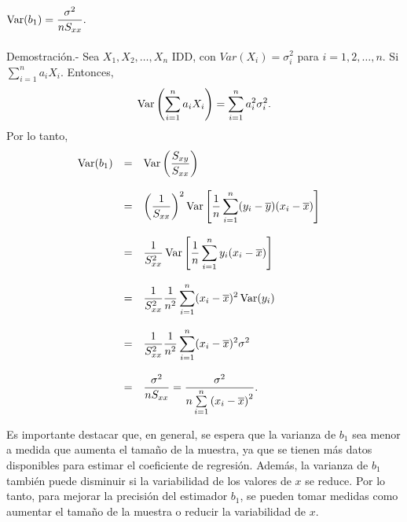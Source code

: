 \begin{teo}
    $\mathop{\mbox{\normalfont Var}}\nolimits(b_1) = \dfrac{\sigma^2}{nS_{xx}}.$\\\\

	Demostración.-\; Sea $X_1,X_2,\ldots,X_n$ IDD, con $Var(X_i)=\sigma_i^2$ para $i=1,2,\ldots,n$. Si $\displaystyle\sum_{i=1}^n a_iX_i.$ Entonces, 
	$$\mathop{\mbox{\normalfont Var}}\nolimits\left(\displaystyle\sum_{i=1}^n a_iX_i\right)=\displaystyle\sum_{i=1}^n a_i^2\sigma_i^2.$$ 
	Por lo tanto,
	$$
	\begin{array}{rcll}
	    \mathop{\mbox{\normalfont Var}}\nolimits(b_1) &=& \mathop{\mbox{\normalfont Var}}\nolimits\left(\dfrac{S_{xy}}{S_{xx}}\right)&\\\\
		      &=& \left(\dfrac{1}{S_{xx}}\right)^2\mathop{\mbox{\normalfont Var}}\nolimits\left[\dfrac{1}{n}\displaystyle\sum_{i=1}^n(y_i-\overline{y})(x_i-\overline{x})\right]&\\\\
		      &=& \dfrac{1}{S_{xx}^2}\mathop{\mbox{\normalfont Var}}\nolimits\left[\dfrac{1}{n}\displaystyle\sum_{i=1}^n y_i(x_i-\overline{x})\right]&\\\\
		      &=& \dfrac{1}{S_{xx}^2}\dfrac{1}{n^2}\displaystyle\sum_{i=1}^n (x_i-\overline{x})^2\mathop{\mbox{\normalfont Var}}\nolimits(y_i)&\\\\
		      &=& \dfrac{1}{S_{xx}^2}\dfrac{1}{n^2}\displaystyle\sum_{i=1}^n (x_i-\overline{x})^2\sigma^2\\\\
		      &=& \dfrac{\sigma^2}{nS_{xx}} = \dfrac{\sigma^2}{n\sum\limits_{i=1}^n \left(x_i-\overline{x}\right)^2}.
	\end{array}
	$$
\end{teo}

Es importante destacar que, en general, se espera que la varianza de $b_1$ sea menor a medida que aumenta el tamaño de la muestra, ya que se tienen más datos disponibles para estimar el coeficiente de regresión. Además, la varianza de $b_1$ también puede disminuir si la variabilidad de los valores de $x$ se reduce. Por lo tanto, para mejorar la precisión del estimador $b_1$, se pueden tomar medidas como aumentar el tamaño de la muestra o reducir la variabilidad de $x$.

